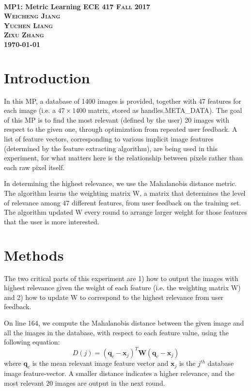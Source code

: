 \documentclass{article}
\begin{document}
	\everymath{\displaystyle}
	\begin{titlepage}	 	
		\center
		\text{}\\[3cm]
		\linespread{2}\Huge \bfseries MP1: Metric Learning
		\center\textsc{\Large ECE 417 Fall 2017}\\[1cm]
		\Large\center\textsc{Weicheng Jiang \\Yuchen Liang\\ Zixu Zhang  }\\[1.5cm]
		\Large \today\\
		\vfill
	\end{titlepage}
	\setlength{\baselineskip}{24pt}
	
	\section{Introduction}
	
	In this MP, a database of 1400 images is provided, together with 47 features for each image (i.e. a $47\times1400$ matrix, stored as handles.META\_DATA). The goal of this MP is to find the most relevant (defined by the user) 20 images with respect to the given one, through optimization from repeated user feedback. A list of feature vectors, corresponding to various implicit image features (determined by the feature extracting algorithm), are being used in this experiment, for what matters here is the relationship between pixels rather than each raw pixel itself.
	
	\justify In determining the highest relevance, we use the Mahalanobis distance metric. The algorithm learns the weighting matrix W, a matrix that determines the level of relevance among 47 different features, from user feedback on the training set. The algorithm updated W every round to arrange larger weight for those features that the user is more interested.
	
	
	\section{Methods}
	
	The two critical parts of this experiment are 1) how to output the images with highest relevance given the weight of each feature (i.e. the weighting matrix W) and 2) how to update W to correspond to the highest relevance from user feedback.
	
	\justify On line 164, we compute the Mahalanobis distance between the given image and all the images in the database, with respect to each feature value, using the following equation:
	$$D(j)=(\mathbf{q}_c-\mathbf{x}_j)^T\mathbf{W}(\mathbf{q}_c-\mathbf{x}_j)$$ where $\mathbf{q}_c$ is the mean relevant image feature vector and $\mathbf{x}_j$ is the $j^{th}$ database image feature-vector. A smaller distance indicates a higher relevance, and the most relevant 20 images are output in the next round.
	
\end{document}
